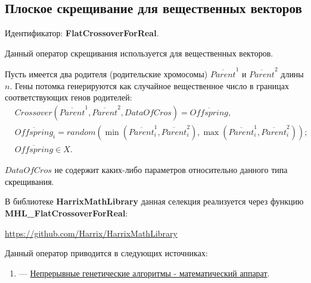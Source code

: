\subsection{Плоское скрещивание для вещественных векторов}\label{SetOfOperatorsAlgorithms:FlatCrossoverForReal}

Идентификатор: \textbf{FlatCrossoverForReal}.

Данный оператор скрещивания используется для вещественных векторов.

Пусть имеется два родителя (родительские хромосомы) $ \overline{Parent}^1 $ и $ \overline{Parent}^2$ длины $n$. Гены потомка генерируются как случайное вещественное число в границах соответствующих генов родителей:
\begin{align}
\label{SetOfOperatorsAlgorithms:eq:FlatCrossoverForReal}
&Crossover \left( \overline{Parent}^1, \overline{Parent}^2, DataOfCros\right)= \overline{Offspring}, \\
& \overline{Offspring}_i=random\left(\min\left(\overline{Parent}^1_i, \overline{Parent}^2_i \right),\max\left(\overline{Parent}^1_i, \overline{Parent}^2_i \right)  \right);\nonumber\\
&\overline{Offspring}\in X.\nonumber
\end{align}

$ DataOfCros $ не содержит каких-либо параметров относительно данного типа скрещивания.

В библиотеке \textbf{HarrixMathLibrary} данная селекция реализуется через функцию \textbf{MHL\_FlatCrossoverForReal}:

\href{https://github.com/Harrix/HarrixMathLibrary}{https://github.com/Harrix/HarrixMathLibrary}

Данный оператор приводится в следующих источниках:

\begin{enumerate}
\item \cite{web:basegroup.ru:real_coded_ga} ---  \href{http://www.basegroup.ru/library/optimization/real_coded_ga/}{Непрерывные генетические алгоритмы - математический аппарат}.
\end{enumerate}